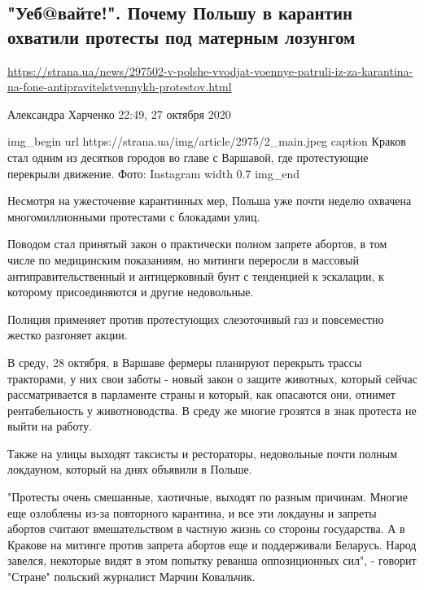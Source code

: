  
 

\subsection{"Уеб@вайте!". Почему Польшу в карантин охватили протесты под матерным лозунгом}
\label{sec:27_10_2020.news.ua.strana.2.poland}

\url{https://strana.ua/news/297502-v-polshe-vvodjat-voennye-patruli-iz-za-karantina-na-fone-antipravitelstvennykh-protestov.html}

Александра Харченко 22:49, 27 октября 2020 

\ifcmt
img_begin 
  url https://strana.ua/img/article/2975/2_main.jpeg
  caption Краков стал одним из десятков городов во главе с Варшавой, где протестующие перекрыли движение. Фото: Instagram 
  width 0.7
img_end
\fi

Несмотря на ужесточение карантинных мер, Польша уже почти неделю охвачена
многомиллионными протестами с блокадами улиц.

Поводом стал принятый закон о практически полном запрете абортов, в том числе
по медицинским показаниям, но митинги переросли в массовый
антиправительственный и антицерковный бунт с тенденцией к эскалации, к которому
присоединяются и другие недовольные. 

Полиция применяет против протестующих слезоточивый газ и повсеместно жестко
разгоняет акции.

В среду, 28 октября, в Варшаве фермеры планируют перекрыть трассы тракторами, у
них свои заботы - новый закон о защите животных, который сейчас рассматривается
в парламенте страны и который, как опасаются они, отнимет рентабельность у
животноводства. В среду же многие грозятся в знак протеста не выйти на работу.

Также на улицы выходят таксисты и рестораторы, недовольные почти полным
локдауном, который на днях объявили в Польше.

"Протесты очень смешанные, хаотичные, выходят по разным причинам. Многие еще
озлоблены из-за повторного карантина, и все эти локдауны и запреты абортов
считают вмешательством в частную жизнь со стороны государства. А в Кракове на
митинге против запрета абортов еще и поддерживали Беларусь. Народ завелся,
некоторые видят в этом попытку реванша оппозиционных сил", - говорит "Стране"
польский журналист Марчин Ковальчик.   

